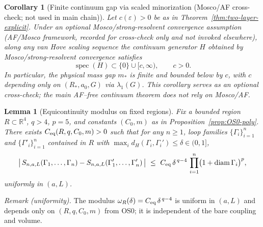 \documentclass[11pt]{amsart}
\theoremstyle{plain}
\newtheorem{lemma}[theorem]{Lemma}
\newtheorem{corollary}[theorem]{Corollary}
\theoremstyle{definition}
\theoremstyle{remark}
\begin{document}
\begin{corollary}[Finite continuum gap via scaled minorization (Mosco/AF cross-check; not used in main chain)]\label{cor:scaled-continuum-gap}
Let $c(\varepsilon)>0$ be as in Theorem~\ref{thm:two-layer-explicit}. Under an \emph{optional} Mosco/strong-resolvent convergence assumption (AF/Mosco framework, recorded for cross-check only and not invoked elsewhere), along any van Hove scaling sequence the continuum generator $H$ obtained by Mosco/strong-resolvent convergence satisfies
\[
  \operatorname{spec}(H)\subset\{0\}\cup[c,\infty),\qquad c>0.
\]
In particular, the physical mass gap $m_*$ is finite and bounded below by $c$, with $c$ depending only on $(R_*,a_0,G)$ via $\lambda_1(G)$. This corollary serves as an \emph{optional cross-check}; the main AF--free continuum theorem does not rely on Mosco/AF.
\end{corollary}
\medskip
\begin{lemma}[Equicontinuity modulus on fixed regions]\label{lem:eqc-modulus}
\label{lem:eqc-modulus-app}
Fix a bounded region $R\subset\mathbb R^4$, $q>4$, $p=5$, and constants $(C_0,m)$ as in Proposition~\ref{prop:OS0-poly}. There exists $C_{\rm eq}(R,q,C_0,m)>0$ such that for any $n\ge 1$, loop families $\{\Gamma_i\}_{i=1}^n$ and $\{\Gamma'_i\}_{i=1}^n$ contained in $R$ with $\max_i d_H(\Gamma_i,\Gamma_i')\le \delta\in(0,1]$,
\[
  \big|\,S_{n,a,L}(\Gamma_1,\dots,\Gamma_n) - S_{n,a,L}(\Gamma'_1,\dots,\Gamma'_n)\,\big|
  \ \le\ C_{\rm eq}\,\delta^{\,q-4}\,\prod_{i=1}^n \bigl(1+\operatorname{diam}\Gamma_i\bigr)^p,
\]
uniformly in $(a,L)$.
\end{lemma}
\noindent\emph{Remark (uniformity).} The modulus $\omega_R(\delta)=C_{\rm eq}\,\delta^{\,q-4}$ is uniform in $(a,L)$ and depends only on $(R,q,C_0,m)$ from OS0; it is independent of the bare coupling and volume.
\end{document}
